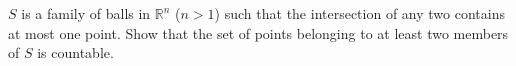 \(S\) is a family of balls in \(\mathbb{R}^{n}\) (\(n > 1\)) such that the intersection of any two contains at most one point. Show that the set of points belonging to at least two members of \(S\) is countable.